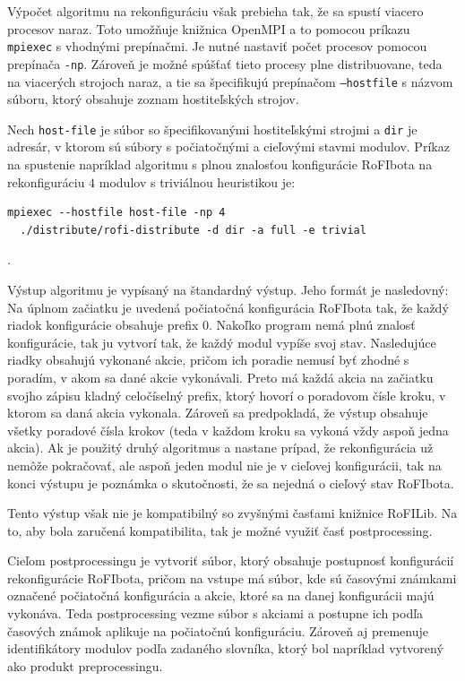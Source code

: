 \documentclass[
  digital, %
  oneside, %
  table,   %
  lof,     %
  nolot,     %
]{fithesis3}
\begin{document}
Výpočet algoritmu na rekonfiguráciu však prebieha tak, že sa spustí viacero procesov naraz. Toto umožňuje knižnica OpenMPI a to pomocou príkazu \texttt{mpiexec} s vhodnými prepínačmi. Je nutné nastaviť počet procesov pomocou prepínača \texttt{-np}. Zároveň je možné spúšťať tieto procesy plne distribuovane, teda na viacerých strojoch naraz, a tie sa špecifikujú prepínačom \texttt{--hostfile} \cite{openMPIHostFile} s názvom súboru, ktorý obsahuje zoznam hostiteľských strojov. 

Nech \texttt{host-file} je súbor so špecifikovanými hostiteľskými strojmi a \texttt{dir} je adresár, v ktorom sú súbory s počiatočnými a cieľovými stavmi modulov. Príkaz na spustenie napríklad algoritmu s plnou znalosťou konfigurácie RoFIbota na rekonfiguráciu $4$ modulov s triviálnou heuristikou je: 
\begin{verbatim}
mpiexec --hostfile host-file -np 4 
  ./distribute/rofi-distribute -d dir -a full -e trivial
\end{verbatim}.

Výstup algoritmu je vypísaný na štandardný výstup. Jeho formát je nasledovný: Na úplnom začiatku je uvedená počiatočná konfigurácia RoFIbota tak, že každý riadok konfigurácie obsahuje prefix $0$. Nakoľko program nemá plnú znalosť konfigurácie, tak ju vytvorí tak, že každý modul vypíše svoj stav. Nasledujúce riadky obsahujú vykonané akcie, pričom ich poradie nemusí byť zhodné s poradím, v akom sa dané akcie vykonávali. Preto má každá akcia na začiatku svojho zápisu kladný celočíselný prefix, ktorý hovorí o poradovom čísle kroku, v ktorom sa daná akcia vykonala. Zároveň sa predpokladá, že výstup obsahuje všetky poradové čísla krokov (teda v každom kroku sa vykoná vždy aspoň jedna akcia). Ak je použitý druhý algoritmus a nastane prípad, že rekonfigurácia už nemôže pokračovať, ale aspoň jeden modul nie je v cieľovej konfigurácii, tak na konci výstupu je poznámka o skutočnosti, že sa nejedná o cieľový stav RoFIbota. 

Tento výstup však nie je kompatibilný so zvyšnými časťami knižnice RoFILib. Na to, aby bola zaručená kompatibilita, tak je možné využiť časť postprocessing. 

Cieľom postprocessingu je vytvoriť súbor, ktorý obsahuje postupnosť konfigurácií rekonfigurácie RoFIbota, pričom na vstupe má súbor, kde sú časovými známkami označené počiatočná konfigurácia a akcie, ktoré sa na danej konfigurácii majú vykonáva. Teda postprocessing vezme súbor s akciami a postupne ich podľa časových známok aplikuje na počiatočnú konfiguráciu. Zároveň aj premenuje identifikátory modulov podľa zadaného slovníka, ktorý bol napríklad vytvorený ako produkt preprocessingu. 
\end{document}
